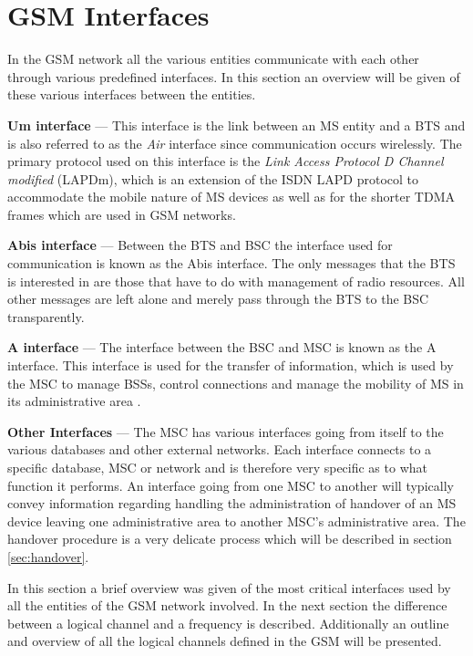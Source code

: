 \section{GSM Interfaces}
\label{sec:gsminterfaces}
In the GSM network all the various entities communicate with each other through various predefined interfaces. In this section an overview will be given of these various interfaces between the entities.
\begin{description}
\item{\textbf{Um interface}} --- This interface is the link between an MS entity and a BTS and is also referred to as the \emph{Air} interface since communication occurs wirelessly. The primary protocol used on this interface is the \emph{Link Access Protocol D Channel modified} (LAPDm), which is an extension of the ISDN LAPD protocol to accommodate the mobile nature of MS devices as well as for the shorter TDMA frames which are used in GSM networks\cite{wirelesstelcoMullet,GSMSecurInTeleNetwork}.
\item{\textbf{Abis interface}} --- Between the BTS and BSC the interface used for communication is known as the Abis interface. The only messages that the BTS is interested in are those that have to do with management of radio resources\cite{wirelesstelcoMullet,GSMSecurInTeleNetwork}. All other messages are left alone and merely pass through the BTS to the BSC transparently.
\item{\textbf{A interface}} --- The interface between the BSC and MSC is known as the A interface. This interface is used for the transfer of information, which is used by the MSC to manage BSSs, control connections and manage the mobility of MS in its administrative area \cite{wirelesstelcoMullet,GSMArchitectureProtocolsServices}.
\item{\textbf{Other Interfaces}} --- The MSC has various interfaces going from itself to the various databases and other external networks. Each interface connects to a specific database, MSC or network and is therefore very specific as to what function it performs\cite{wirelesstelcoMullet,GSMArchitectureProtocolsServices}. An interface going from one MSC to another will typically convey information regarding handling the administration of handover of an MS device leaving one administrative area to another MSC's administrative area. The handover procedure is a very delicate process which will be described in section \ref{sec:handover}.
\end{description}

In this section a brief overview was given of the most critical interfaces used by all the entities of the GSM network involved. In the next section the difference between a logical channel and a frequency is described. Additionally an outline and overview of all the logical channels defined in the GSM will be presented. 
